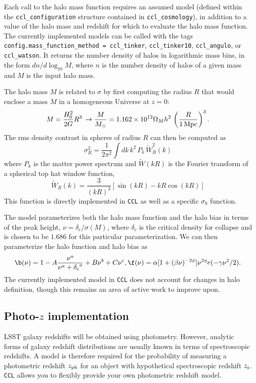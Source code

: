 \documentclass[\docopts]{\docclass}
\begin{document}
Each call to the halo mass function requires an assumed model (defined within the {\tt ccl\_configuration} structure contained in {\tt ccl\_cosmology}), in addition to a value of the halo mass and redshift for which to evaluate the halo mass function. The currently implemented models can be called with the tags {\tt config.mass\_function\_method = ccl\_tinker}, {\tt ccl\_tinker10}, {\tt ccl\_angulo}, or {\tt ccl\_watson}. It returns the number density of halos in logarithmic mass bins, in the form $dn/d\log_{10}{M}$, where $n$ is the number density of halos of a given mass and $M$ is the input halo mass.

The halo mass $M$ is related to $\sigma$ by first computing the radius $R$ that would enclose a mass $M$ in a homogeneous Universe at $z=0$:
\begin{equation}
  M=\frac{H_0^2}{2G}R^3\,\rightarrow \frac{M}{M_\odot}=1.162\times10^{12}\Omega_Mh^2\,\left(\frac{R}{1\,{\rm Mpc}}\right)^3.
\end{equation}
The rms density contrast in spheres of radius $R$ can then be computed as
\begin{equation}
  \sigma_R^2 = \frac{1}{2\pi^2}\int dk\,k^2\,P_k\,\tilde{W}_R^2(k)
  \label{eq:sigR}
\end{equation}
where $P_k$ is the matter power spectrum and $\tilde{W}(kR)$ is the Fourier transform of a spherical top hat window function,
\begin{equation}
\tilde{W}_R(k) = \frac{3}{(kR)^3}[\sin(kR)-kR\cos(kR)]
\end{equation}
%
This function is directly implemented in {\tt CCL} as well as a specific $\sigma_8$ function.
 
The \citet{Tinker2010} model parameterizes both the halo mass function and the halo bias in terms of the peak height, $\nu = \delta_c / \sigma(M)$, where $\delta_c$ is the critical density for collapse and is chosen to be $1.686$ for this particular parameterization. We can then parameterize the halo function and halo bias as
\begin{equation}
  \b(\nu) = 1 - A\frac{\nu^a}{\nu^a + {\delta_c}^a} + B\nu^b+C\nu^c,
  \f(\nu) = \alpha[1+(\beta\nu)^{-2\phi}]\nu^{2\eta}e(-\gamma\nu^2/2).
\end{equation}
The currently implemented model in {\tt CCL} does not account for changes in halo definition, though this remains an area of active work to improve upon.

\subsection{Photo-$z$ implementation}
\label{sec:photoz}
LSST galaxy redshifts will be obtained using photometry. However, analytic forms of galaxy redshift distributions are usually known in terms of spectroscopic redshifts. A model is therefore required for the probability of measuring a photometric redshift $z_{\rm ph}$ for an object with hypothetical spectroscopic redshift $z_{\rm s}$. {\tt CCL} allows you to flexibly provide your own photometric redshift model.
\end{document}
